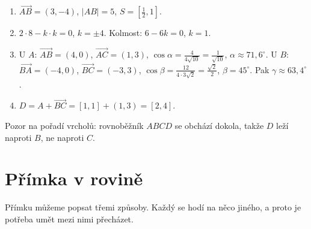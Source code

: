 \begin{solution}
  \begin{enumerate}[label=(\alph*)]
    \item $\overrightarrow{AB} = (3, -4)$, $|AB| = 5$, $S = \left[\frac{1}{2}, 1\right]$.
    \item $2\cdot 8 - k\cdot k = 0$, $k = \pm 4$. Kolmost: $6 - 6k = 0$, $k = 1$.
    \item U $A$: $\overrightarrow{AB} = (4, 0)$, $\overrightarrow{AC} = (1, 3)$, $\cos\alpha = \frac{4}{4\sqrt{10}} = \frac{1}{\sqrt{10}}$, $\alpha\approx 71{,}6^\circ$. U $B$: $\overrightarrow{BA} = (-4, 0)$, $\overrightarrow{BC} = (-3, 3)$, $\cos\beta = \frac{12}{4\cdot 3\sqrt{2}} = \frac{\sqrt{2}}{2}$, $\beta = 45^\circ$. Pak $\gamma\approx 63{,}4^\circ$.
    \item $D = A + \overrightarrow{BC} = [1, 1] + (1, 3) = [2, 4]$.
  \end{enumerate}
  \begin{center}
  \end{center}
  Pozor na pořadí vrcholů: rovnoběžník $ABCD$ se obchází dokola, takže $D$ leží naproti $B$, ne naproti $C$.
\end{solution}

\section{Přímka v rovině}\label{sec:primka-v-rovine}

Přímku můžeme popsat třemi způsoby. Každý se hodí na něco jiného, a proto je potřeba umět mezi nimi přecházet.

